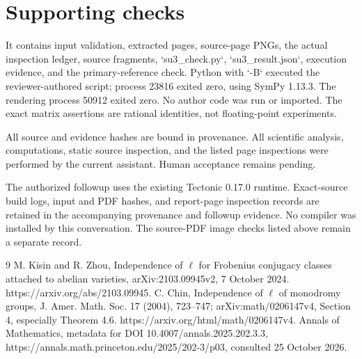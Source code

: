 \documentclass[10pt]{article}
\begin{document}
\section*{Supporting checks}
It contains input validation, extracted pages, source-page PNGs, the actual inspection ledger, source fragments, `su3\_check.py`, `su3\_result.json`, execution evidence, and the primary-reference check. Python with `-B` executed the reviewer-authored script; process 23816 exited zero, using SymPy 1.13.3. The rendering process 50912 exited zero. No author code was run or imported. The exact matrix assertions are rational identities, not floating-point experiments.\par
All source and evidence hashes are bound in provenance. All scientific analysis, computations, static source inspection, and the listed page inspections were performed by the current assistant. Human acceptance remains pending.\par
The authorized followup uses the existing Tectonic 0.17.0 runtime. Exact-source build logs, input and PDF hashes, and report-page inspection records are retained in the accompanying provenance and followup evidence. No compiler was installed by this conversation. The source-PDF image checks listed above remain a separate record.\par
9 M. Kisin and R. Zhou, Independence of \(\ell\) for Frobenius conjugacy classes attached to abelian varieties, arXiv:2103.09945v2, 7 October 2024. https://arxiv.org/abs/2103.09945. C. Chin, Independence of \(\ell\) of monodromy groups, J. Amer. Math. Soc. 17 (2004), 723–747; arXiv:math/0206147v4, Section 4, especially Theorem 4.6. https://arxiv.org/html/math/0206147v4. Annals of Mathematics, metadata for DOI 10.4007/annals.2025.202.3.3, https://annals.math.princeton.edu/2025/202-3/p03, consulted 25 October 2026.\par
\end{document}
